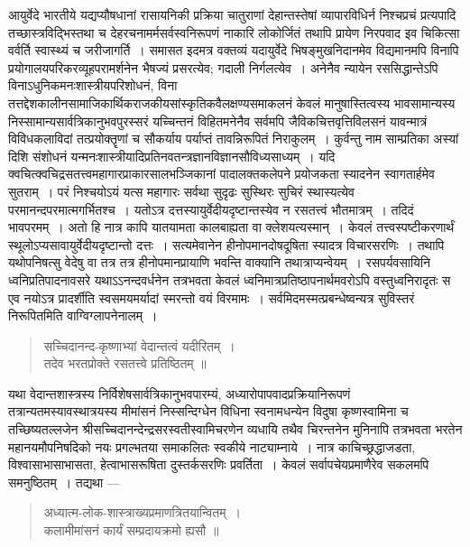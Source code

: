 {\dev आयुर्वेदे भारतीये यद्यप्यौषधानां रासायनिकी प्रक्रिया चातुराणां देहान्तस्तेषां व्यापारविधिर्न निश्चप्रचं प्रत्यपादि तच्छास्त्रविद्भिस्तथा च देहरचनामर्मसर्वस्वनिरूपणं नाकारि लोकोर्जितं तथापि प्रायेण निरपवाद इव चिकित्सा वर्वर्ति स्वास्थ्यं च जरीजागर्ति~। समासत इदमत्र वक्तव्यं यदायुर्वेदे भिषङ्मुखनिदानमेव विद्यमानमपि विनापि प्रयोगालयपरिकरव्यूहपरामर्श\-नेन भैषज्यं प्रसरत्येव; गदाली निर्गलत्येव~। अनेनैव न्यायेन रससिद्धान्तेऽपि विनाऽधुनिक\-मनः\-शास्त्रीयपरिशोधनं, विना तत्तद्देशकालीनसामाजिकार्थिकराजकीयसांस्कृतिकवैलक्षण्य\-समा\-कलनं केवलं मानुषास्तित्वस्य भावसामान्यस्य निस्सामान्यसार्वत्रिकानुभवपुरस्सरं यच्चिन्तनं विहितमनेनैव सर्वमपि जैविकचित्तवृत्तिविलसनं यावन्मात्रं विविधकलाविदां तत्प्रयोक्तॄणां च सौकर्याय पर्याप्तं तावन्निरूपितं निराकुलम्~। कुर्वन्तु नाम साम्प्रतिका अस्यां दिशि संशोधनं यन्मनःशास्त्रीयादिप्रतिनवतन्त्रज्ञानविज्ञानसौविध्यसाध्यम्~। यदि क्वचित्क्वचिद्रसतत्त्वमहा\-गारप्राकारसालभञ्जिकानां पादालक्तकलेपने प्रयोजकता स्यादनेन स्वागतार्हमेव सुतराम्~। परं निश्चयोऽयं यत्स महागारः सर्वथा सुदृढः सुस्थिरः सुचिरं स्थास्यत्येव परमानन्दपरमात्म\-गर्भितश्च~। यतोऽत्र दत्तस्यायुर्वेदीयदृष्टान्तस्येव न रसतत्त्वं भौतमात्रम्~। तदिदं भावपरमम्~। अतो हि नात्र कापि यातयामता कालबाह्यता वा क्लेशयत्यस्मान्~। केवलं तत्त्वस्पष्टीकर\-णार्थं स्थूलोऽप्यसावायुर्वेदीयदृष्टान्तो दत्तः~। सत्यमेवानेन हीनोपमानदोषदूषिता स्यादत्र विचार\-सरणिः~। तथापि यथोपनिषत्सु वेदेषु वा तत्र तत्र हीनोपमानप्रायाणि भवन्ति वाक्यानि तथात्रा\-प्यन्वेयम्~। रसपर्यवसायिनि ध्वनिप्रतिपादनावसरे यथाऽऽनन्दवर्धनेन तत्रभवता केवलं ध्वनि\-मात्रप्रतिष्ठापनार्थमवरोऽपि वस्तुध्वनिरादृतः स एव नयोऽत्र प्रादर्शीति स्वसमयमर्यादां स्मरन्तो वयं विरमामः~। सर्वमिदमस्मत्प्रबन्धेष्वन्यत्र सुविस्तरं निरूपितमिति वाग्विग्लापनेनालम्~।}
\begin{quote}
{\dev सच्चिदानन्द-कृष्णाभ्यां वेदान्तत्वं यदीरितम्~।}\\
{\dev तदेव भरतप्रोक्ते रसतत्त्वे प्रतिष्ठितम् ॥}
\end{quote}

{\dev यथा वेदान्तशास्त्रस्य निर्विशेषसार्वत्रिकानुभवपारम्यं, अध्यारोपापवादप्रक्रियानिरूपणं तत्रान्य\-तमस्यावस्थात्रयस्य मीमांसनं निस्सन्दिग्धेन विधिना स्वनामधन्येन विदुषा कृष्णस्वामिना च तच्छिष्यतल्लजेन श्रीसच्चिदानन्देन्द्रसरस्वतीस्वामिचरणेन व्यधायि तथैव चिरन्तनेन मुनिनापि तत्रभवता भरतेन महानयमौपनिषदिको नयः प्रगल्भतया समाकलितः स्वकीये नाट्याम्नाये~। नात्र काचिच्छ्रद्धाजडता, विश्वासाभासाभासता, हेत्वाभासरूषिता दुस्तर्कसरणिः प्रवर्तिता~। केवलं सर्वापचेयप्रमाणैरेव सकलमपि समनुष्ठितम्~। तद्यथा ---} 
\begin{quote}
{\dev अध्यात्म-लोक-शास्त्राख्यप्रमाणत्रितयान्वितम्~।}\\
{\dev कलामीमांसनं कार्यं सम्प्रदायक्रमो ह्यसौ ॥}
\end{quote}

